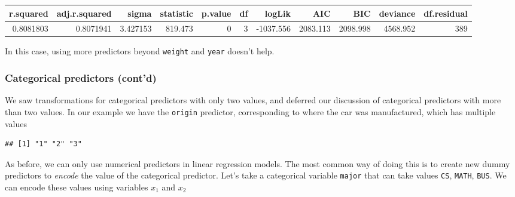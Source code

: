 \documentclass[]{article}
\newenvironment{Shaded}{\begin{snugshade}}{\end{snugshade}}
\newcommand{\KeywordTok}[1]{\textcolor[rgb]{0.13,0.29,0.53}{\textbf{{#1}}}}
\newcommand{\DataTypeTok}[1]{\textcolor[rgb]{0.13,0.29,0.53}{{#1}}}
\newcommand{\StringTok}[1]{\textcolor[rgb]{0.31,0.60,0.02}{{#1}}}
\newcommand{\NormalTok}[1]{{#1}}
\theoremstyle{definition}
\theoremstyle{definition}
\theoremstyle{remark}
\begin{document}
\begin{Shaded}
\end{Shaded}

\begin{tabular}{r|r|r|r|r|r|r|r|r|r|r}
\hline
r.squared & adj.r.squared & sigma & statistic & p.value & df & logLik & AIC & BIC & deviance & df.residual\\
\hline
0.8081803 & 0.8071941 & 3.427153 & 819.473 & 0 & 3 & -1037.556 & 2083.113 & 2098.998 & 4568.952 & 389\\
\hline
\end{tabular}

In this case, using more predictors beyond \texttt{weight} and
\texttt{year} doesn't help.

\subsubsection{Categorical predictors
(cont'd)}\label{categorical-predictors-contd}

We saw transformations for categorical predictors with only two values,
and deferred our discussion of categorical predictors with more than two
values. In our example we have the \texttt{origin} predictor,
corresponding to where the car was manufactured, which has multiple
values

\begin{Shaded}
\end{Shaded}

\begin{verbatim}
## [1] "1" "2" "3"
\end{verbatim}

As before, we can only use numerical predictors in linear regression
models. The most common way of doing this is to create new dummy
predictors to \emph{encode} the value of the categorical predictor.
Let's take a categorical variable \texttt{major} that can take values
\texttt{CS}, \texttt{MATH}, \texttt{BUS}. We can encode these values
using variables \(x_1\) and \(x_2\)
\end{document}
